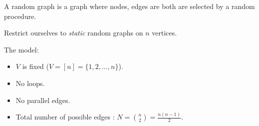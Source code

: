 \documentclass{beamer}
\begin{document}
	\begin{frame}
		\begin{definition}
			A random graph is a graph where nodes, edges are both are selected by a random procedure.
		\end{definition}
		Restrict ourselves to \emph{static} random graphs on $n$ vertices.
		\begin{block}{The model:}
			\begin{itemize}
				\item $V$ is fixed ($V = [n] = \{1,2,\ldots,n\}$).
				\item No loops.
				\item No parallel edges.
				\item Total number of possible edges : $N= \binom{n}{2} = \frac{n(n-1)}{2}$.
			\end{itemize}
		\end{block}
	\end{frame}
\end{document}
